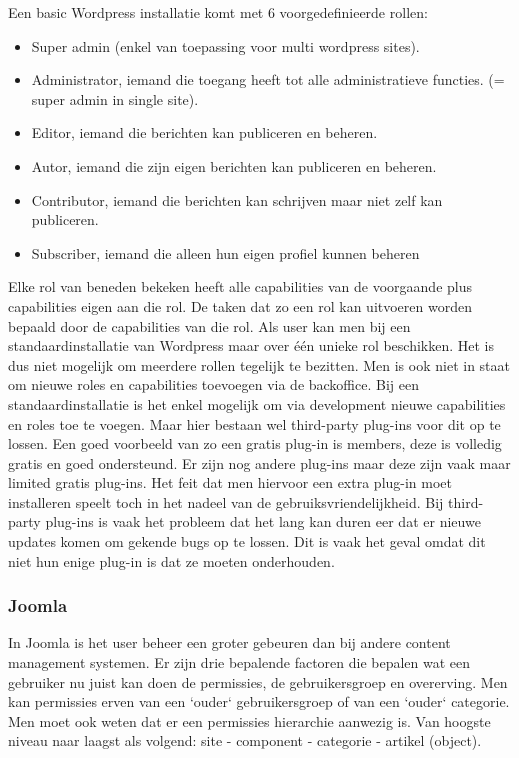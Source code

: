 Een basic Wordpress installatie komt met 6 voorgedefinieerde rollen:
\begin{itemize}
	\item Super admin (enkel van toepassing voor multi wordpress sites).
	\item Administrator, iemand die toegang heeft tot alle administratieve functies. (= super admin in single site).
	\item Editor, iemand die berichten kan publiceren en beheren.
	\item Autor, iemand die zijn eigen berichten kan publiceren en beheren.
	\item Contributor, iemand die berichten kan schrijven maar niet zelf kan publiceren.
	\item Subscriber, iemand die alleen hun eigen profiel kunnen beheren
\end{itemize}
Elke rol van beneden bekeken heeft alle capabilities van de voorgaande plus capabilities eigen aan die rol. De taken dat zo een rol kan uitvoeren worden bepaald door de capabilities van die rol. Als user kan men bij een standaardinstallatie van Wordpress maar over één unieke rol beschikken. Het is dus niet mogelijk om meerdere rollen tegelijk te bezitten. Men is ook niet in staat om nieuwe roles en capabilities toevoegen via de backoffice. Bij een standaardinstallatie is het enkel mogelijk om via development nieuwe capabilities en roles toe te voegen. Maar hier bestaan wel third-party plug-ins voor dit op te lossen. Een goed voorbeeld van zo een gratis plug-in is members, deze is volledig gratis en goed ondersteund. Er zijn nog andere plug-ins maar deze zijn vaak maar limited gratis plug-ins. Het feit dat men hiervoor een extra plug-in moet installeren speelt toch in het nadeel van de gebruiksvriendelijkheid. Bij third-party plug-ins is vaak het probleem dat het lang kan duren eer dat er nieuwe updates komen om gekende bugs op te lossen. Dit is vaak het geval omdat dit niet hun enige plug-in is dat ze moeten onderhouden.

\subsubsection{Joomla}
In Joomla is het user beheer een groter gebeuren dan bij andere content management systemen. Er zijn drie bepalende factoren die bepalen wat een gebruiker nu juist kan doen de permissies, de gebruikersgroep en overerving. Men kan permissies erven van een `ouder` gebruikersgroep of van een `ouder` categorie. Men moet ook weten dat er een permissies hierarchie aanwezig is. Van hoogste niveau naar laagst als volgend: site - component - categorie - artikel (object).

